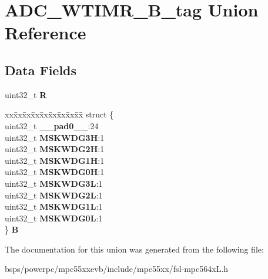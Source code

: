 \hypertarget{unionADC__WTIMR__32B__tag}{}\section{A\+D\+C\+\_\+\+W\+T\+I\+M\+R\+\_\+B\+\_\+tag Union Reference}
\label{unionADC__WTIMR__32B__tag}
\subsection*{Data Fields}
\begin{DoxyCompactItemize}
\item 
\mbox{\label{unionADC__WTIMR__32B__tag_ab20870bb384d2b0b7626e01a14fc4cc4}} 
uint32\+\_\+t {\bfseries R}
\item 
\mbox{\label{unionADC__WTIMR__32B__tag_aebe8313958bb0bfd6465a419b3e48dbc}} 
\begin{tabbing}
xx\=xx\=xx\=xx\=xx\=xx\=xx\=xx\=xx\=\kill
struct \{\\
\>uint32\_t {\bfseries \_\_pad0\_\_}:24\\
\>uint32\_t {\bfseries MSKWDG3H}:1\\
\>uint32\_t {\bfseries MSKWDG2H}:1\\
\>uint32\_t {\bfseries MSKWDG1H}:1\\
\>uint32\_t {\bfseries MSKWDG0H}:1\\
\>uint32\_t {\bfseries MSKWDG3L}:1\\
\>uint32\_t {\bfseries MSKWDG2L}:1\\
\>uint32\_t {\bfseries MSKWDG1L}:1\\
\>uint32\_t {\bfseries MSKWDG0L}:1\\
\} {\bfseries B}\\

\end{tabbing}\end{DoxyCompactItemize}


The documentation for this union was generated from the following file\+:\begin{DoxyCompactItemize}
\item 
bsps/powerpc/mpc55xxevb/include/mpc55xx/fsl-\/mpc564x\+L.\+h\end{DoxyCompactItemize}
